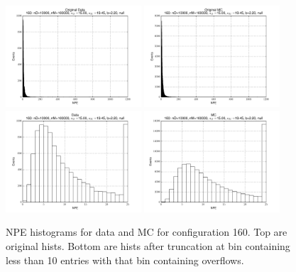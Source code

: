  \begin{figure}[htbp] \begin{center} 
\includegraphics[width=0.45\textwidth]{../FIGURES/160/FIG_Original_Data.pdf} 
\includegraphics[width=0.45\textwidth]{../FIGURES/160/FIG_Original_MC.pdf} 
\includegraphics[width=0.45\textwidth]{../FIGURES/160/FIG_Data.pdf} 
\includegraphics[width=0.45\textwidth]{../FIGURES/160/FIG_MC.pdf} 
\caption{NPE histograms for data and MC for configuration 160. Top are original hists. Bottom are hists after truncation at bin containing less than 10 entries with that bin containing overflows.} 
\label{tab:npe_160} 
\end{center} \end{figure} 
\clearpage
 